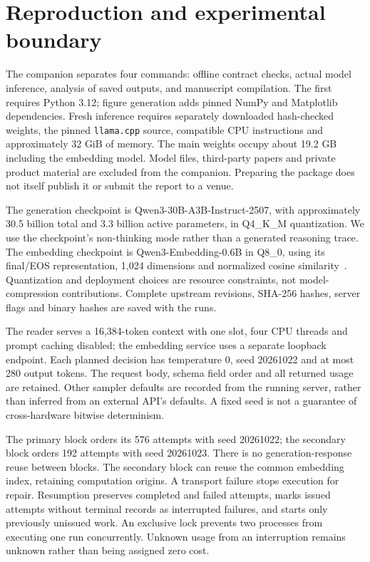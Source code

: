 \section{Reproduction and experimental boundary}
The companion separates four commands: offline contract checks, actual model inference, analysis of saved outputs, and manuscript compilation. The first requires Python 3.12; figure generation adds pinned NumPy and Matplotlib dependencies. Fresh inference requires separately downloaded hash-checked weights, the pinned \texttt{llama.cpp} source, compatible CPU instructions and approximately 32 GiB of memory. The main weights occupy about 19.2 GB including the embedding model. Model files, third-party papers and private product material are excluded from the companion. Preparing the package does not itself publish it or submit the report to a venue.

The generation checkpoint is Qwen3-30B-A3B-Instruct-2507, with approximately 30.5 billion total and 3.3 billion active parameters, in Q4\_K\_M quantization. We use the checkpoint's non-thinking mode rather than a generated reasoning trace. The embedding checkpoint is Qwen3-Embedding-0.6B in Q8\_0, using its final/EOS representation, 1,024 dimensions and normalized cosine similarity~\citep{p250509388,p250605176}. Quantization and deployment choices are resource constraints, not model-compression contributions. Complete upstream revisions, SHA-256 hashes, server flags and binary hashes are saved with the runs.

The reader serves a 16,384-token context with one slot, four CPU threads and prompt caching disabled; the embedding service uses a separate loopback endpoint. Each planned decision has temperature 0, seed 20261022 and at most 280 output tokens. The request body, schema field order and all returned usage are retained. Other sampler defaults are recorded from the running server, rather than inferred from an external API's defaults. A fixed seed is not a guarantee of cross-hardware bitwise determinism.

The primary block orders its 576 attempts with seed 20261022; the secondary block orders 192 attempts with seed 20261023. There is no generation-response reuse between blocks. The secondary block can reuse the common embedding index, retaining computation origins. A transport failure stops execution for repair. Resumption preserves completed and failed attempts, marks issued attempts without terminal records as interrupted failures, and starts only previously unissued work. An exclusive lock prevents two processes from executing one run concurrently. Unknown usage from an interruption remains unknown rather than being assigned zero cost.

